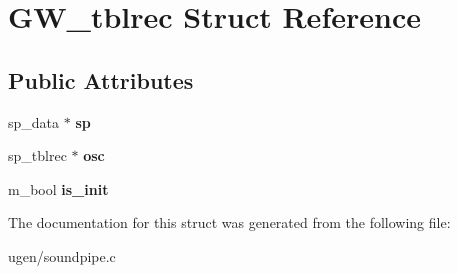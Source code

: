 \hypertarget{structGW__tblrec}{}\section{G\+W\+\_\+tblrec Struct Reference}
\label{structGW__tblrec}
\subsection*{Public Attributes}
\begin{DoxyCompactItemize}
\item 
\hypertarget{structGW__tblrec_ab4c8ce33ca8f3b0abd5c875496adef1c}{}\label{structGW__tblrec_ab4c8ce33ca8f3b0abd5c875496adef1c} 
sp\+\_\+data $\ast$ {\bfseries sp}
\item 
\hypertarget{structGW__tblrec_a22f895930f7303d1302f6f2f023697f0}{}\label{structGW__tblrec_a22f895930f7303d1302f6f2f023697f0} 
sp\+\_\+tblrec $\ast$ {\bfseries osc}
\item 
\hypertarget{structGW__tblrec_a6289e6b3aa992391dae9dff360a5e2c2}{}\label{structGW__tblrec_a6289e6b3aa992391dae9dff360a5e2c2} 
m\+\_\+bool {\bfseries is\+\_\+init}
\end{DoxyCompactItemize}


The documentation for this struct was generated from the following file\+:\begin{DoxyCompactItemize}
\item 
ugen/soundpipe.\+c\end{DoxyCompactItemize}
